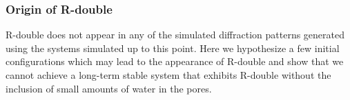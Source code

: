 \documentclass[journal=jpcbfk,manuscript=article]{achemso}
\begin{document}
 

  \subsubsection{Origin of R-double}\label{section:rdouble}
  
  R-double does not appear in any of the simulated diffraction patterns generated using
  the systems simulated up to this point. Here we hypothesize a few initial 
  configurations which may lead to the appearance of R-double and show that we cannot
  achieve a long-term stable system that exhibits R-double without the inclusion of 
  small amounts of water in the pores.
  
\end{document}
